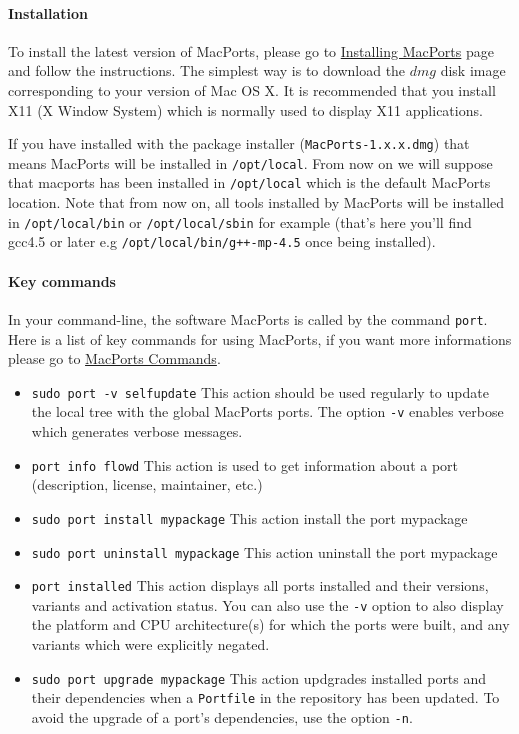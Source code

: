 \paragraph{Installation}
To install the latest version of MacPorts, please go to
\href{http://www.macports.org/install.php}{Installing MacPorts} page and follow
the instructions. The simplest way is to download the $dmg$ disk image
corresponding to your version of Mac OS X. It is recommended that you install
X11 (X Window System) which is normally used to display X11
applications.%

If you have installed with the package installer
(\lstinline|MacPorts-1.x.x.dmg|) that means MacPorts will be installed in
\lstinline|/opt/local|. From now on we will suppose that macports has been
installed in \lstinline|/opt/local| which is the default MacPorts location. Note
that from now on, all tools installed by MacPorts will be installed in
\lstinline!/opt/local/bin! or \lstinline!/opt/local/sbin! for example (that's
here you'll find gcc4.5 or later e.g \lstinline!/opt/local/bin/g++-mp-4.5! once being
installed).%

\paragraph{Key commands}
In your command-line, the software MacPorts is called by the command \lstinline|port|.
Here is a list of key commands for using MacPorts, if you want more informations please go to \href{http://guide.macports.org/#using.port}{MacPorts Commands}.
\begin{itemize}
\item \lstinline|sudo port -v selfupdate|
	This action should be used regularly to update the local tree with the global MacPorts ports. The option \lstinline|-v| enables verbose which generates verbose messages.
\item \lstinline|port info flowd|
	This action is used to get information about a port (description, license, maintainer, etc.)
\item \lstinline|sudo port install mypackage|
	This action install the port mypackage
\item \lstinline|sudo port uninstall mypackage|
	This action uninstall the port mypackage
\item \lstinline|port installed|
	This action displays all ports installed and their versions, variants and activation status. You can also use the \lstinline|-v| option to also display the platform and CPU architecture(s) for which the ports were built, and any variants which were explicitly negated.
\item \lstinline|sudo port upgrade mypackage|
	This action updgrades installed ports and their dependencies when a \lstinline|Portfile| in the repository has been updated. To avoid the upgrade of a port's dependencies, use the option \lstinline|-n|.
\end{itemize}

